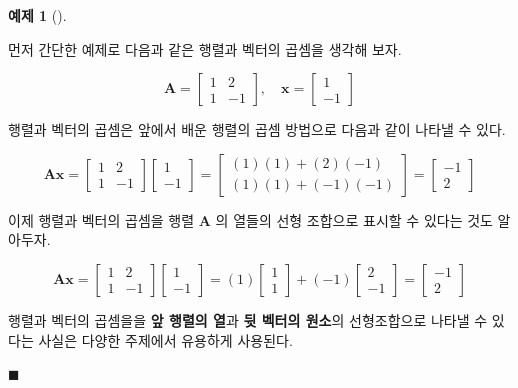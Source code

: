\documentclass[
  11pt,
  a4paper,
  oneside]{scrbook}
\theoremstyle{definition}
\theoremstyle{definition}
\newtheorem{exercise}{예제}[chapter]
\theoremstyle{plain}
\theoremstyle{remark}
\begin{document}
\begin{exercise}[]\protect\hypertarget{exr-mat-vec-product}{}\label{exr-mat-vec-product}

먼저 간단한 예제로 다음과 같은 행렬과 벡터의 곱셈을 생각해 보자.

\[
\pmb A =
\begin{bmatrix}
1 & 2 \\
1 & -1 
\end{bmatrix},
\quad
\pmb x =
\begin{bmatrix}
1 \\
-1
\end{bmatrix}
\]

행렬과 벡터의 곱셈은 앞에서 배운 행렬의 곱셈 방법으로 다음과 같이 나타낼
수 있다.

\[
\pmb A \pmb x =
\begin{bmatrix}
1 & 2 \\
1 & -1 
\end{bmatrix}
\begin{bmatrix}
1 \\
-1
\end{bmatrix}
=
\begin{bmatrix}
(1)(1) + (2)(-1)  \\
(1)(1) + (-1)(-1) 
\end{bmatrix}
=
\begin{bmatrix}
-1 \\
2
\end{bmatrix}
\]

이제 행렬과 벡터의 곱셈을 행렬 \(\pmb A\) 의 열들의 선형 조합으로 표시할
수 있다는 것도 알아두자.

\[
\pmb A \pmb x =
\begin{bmatrix}
1 & 2 \\
1 & -1 
\end{bmatrix}
\begin{bmatrix}
1 \\
-1
\end{bmatrix}
=(1)
\begin{bmatrix}
1 \\
1
\end{bmatrix}
+ (-1)
\begin{bmatrix}
2 \\
-1
\end{bmatrix}
=
\begin{bmatrix}
-1 \\
2
\end{bmatrix}
\]

행렬과 벡터의 곱셈을을 \textbf{앞 행렬의 열}과 \textbf{뒷 벡터의 원소}의
선형조합으로 나타낼 수 있다는 사실은 다양한 주제에서 유용하게 사용된다.

\(\blacksquare\)

\end{exercise}
\end{document}
